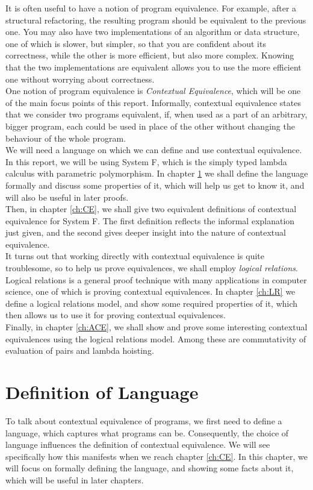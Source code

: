 \documentclass[twoside,11pt,openright]{report}
\theoremstyle{definition}
\begin{document}
It is often useful to have a notion of program equivalence. For example, after a structural refactoring, the resulting program should be equivalent to the previous one. You may also have two implementations of an algorithm or data structure, one of which is slower, but simpler, so that you are confident about its correctness, while the other is more efficient, but also more complex. Knowing that the two implementations are equivalent allows you to use the more efficient one without worrying about correctness.\\
One notion of program equivalence is \textit{Contextual Equivalence}, which will be one of the main focus points of this report. Informally, contextual equivalence states that we consider two programs equivalent, if, when used as a part of an arbitrary, bigger program, each could be used in place of the other without changing the behaviour of the whole program.\\
We will need a language on which we can define and use contextual equivalence.
In this report, we will be using System F, which is the simply typed lambda calculus with parametric polymorphism. In chapter \ref{ch:DoL} we shall define the language formally and discuss some properties of it, which will help us get to know it, and will also be useful in later proofs.\\
Then, in chapter \ref{ch:CE}, we shall give two equivalent definitions of contextual equivalence for System F. The first definition reflects the informal explanation just given, and the second gives deeper insight into the nature of contextual equivalence.\\
It turns out that working directly with contextual equivalence is quite troublesome, so to help us prove equivalences, we shall employ \textit{logical relations}. Logical relations is a general proof technique with many applications in computer science, one of which is proving contextual equivalences. In chapter \ref{ch:LR} we define a logical relations model, and show some required properties of it, which then allows us to use it for proving contextual equivalences.\\
Finally, in chapter \ref{ch:ACE}, we shall show and prove some interesting contextual equivalences using the logical relations model. Among these are commutativity of evaluation of pairs and lambda hoisting.


\chapter{Definition of Language}
\label{ch:DoL}
To talk about contextual equivalence of programs, we first need to define a language, which captures what programs can be. Consequently, the choice of language influences the definition of contextual equivalence. We will see specifically how this manifests when we reach chapter \ref{ch:CE}. In this chapter, we will focus on formally defining the language, and showing some facts about it, which will be useful in later chapters.
\end{document}
